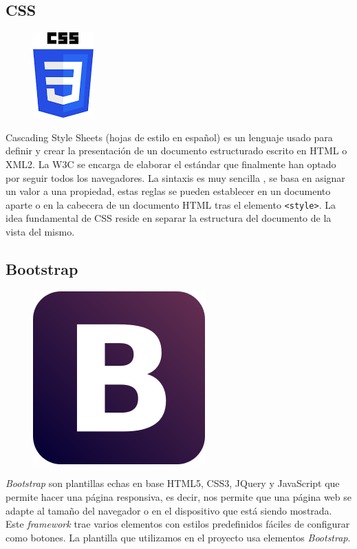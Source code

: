 \documentclass[a4paper, 12pt]{book}
\begin{document}
\subsection{CSS}
\label{subsec:css}
\begin{figure}[h]
    \centering
    \includegraphics[scale=0.7]{img/logo_css.png}
    \label{fig:logoCss}
\end{figure}
Cascading Style Sheets (hojas de estilo en español) es un lenguaje usado para definir y crear la presentación de un documento estructurado escrito en HTML o XML2. La W3C se encarga de elaborar el estándar que finalmente han optado por seguir todos los navegadores. La sintaxis es muy sencilla , se basa en asignar un valor a una propiedad, estas reglas se pueden establecer en un documento aparte o en la cabecera de un documento HTML tras el elemento \texttt{<style>}. La idea fundamental de CSS reside en separar la estructura del documento de la vista del mismo. 

\subsection{Bootstrap}
\label{subsec:boot}
\begin{figure}[H]
    \centering
    \includegraphics[scale=0.3]{./img/logo_bootstrap.png}
    \label{fig:logoBoot}
\end{figure}
\emph{Bootstrap} son plantillas echas en base HTML5, CSS3, JQuery y JavaScript que permite hacer una página responsiva, es decir, nos permite que una página web se adapte al tamaño del navegador  o en el dispositivo que está siendo mostrada. Este \emph{framework} trae varios elementos con estilos predefinidos fáciles de configurar como botones. La plantilla que utilizamos en el proyecto usa elementos \emph{Bootstrap}. 
\end{document}
